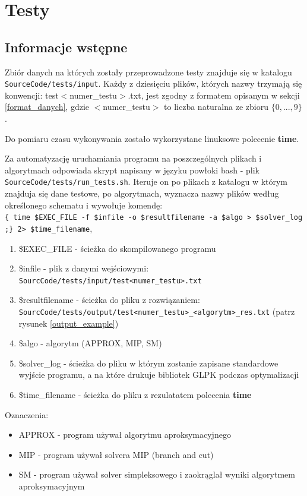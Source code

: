 \chapter{Testy}
\thispagestyle{chapterBeginStyle}
\section{Informacje wstępne}
Zbiór danych na których zostały przeprowadzone testy znajduje się w katalogu \verb|SourceCode/tests/input|. Każdy z dziesięciu plików, których nazwy trzymają się konwencji: test$<$numer\_testu$>$.txt, jest zgodny z formatem opisanym w sekcji \ref{format_danych}, gdzie $<$numer\_testu$>$ to liczba naturalna ze zbioru $\{0, ..., 9\}$.

Do pomiaru czasu wykonywania zostało wykorzystane linuksowe polecenie \textbf{time}.

Za automatyzację uruchamiania programu na poszczególnych plikach i algorytmach odpowiada skrypt napisany w języku powłoki bash - plik \verb|SourceCode/tests/run_tests.sh|. Iteruje on po plikach z katalogu w którym znajduja się dane testowe, po algorytmach, wyznacza nazwy plików według określonego schematu i wywołuje komendę: \\
\verb|{ time $EXEC_FILE -f $infile -o $resultfilename -a $algo > $solver_log ;} 2> $time_filename|, 

\begin{enumerate}
	\item \$EXEC\_FILE - ścieżka do skompilowanego programu
	\item \$infile - plik z danymi wejściowymi: \\
	\verb|SourcCode/tests/input/test<numer_testu>.txt|
	\item \$resultfilename - ścieżka do pliku z rozwiązaniem: \\ \verb|SourcCode/tests/output/test<numer_testu>_<algorytm>_res.txt| (patrz rysunek \ref{output_example})
	\item \$algo - algorytm (APPROX, MIP, SM)
	\item \$solver\_log - ścieżka do pliku w którym zostanie zapisane standardowe wyjście programu, a na które drukuje bibliotek GLPK podczas optymalizacji
	\item \$time\_filename - ścieżka do pliku z rezulatatem polecenia \textbf{time}
\end{enumerate}

Oznaczenia:
\begin{itemize}
	\item APPROX - program używał algorytmu aproksymacyjnego
	\item MIP - program używał solvera MIP (branch and cut)
	\item SM - program używał solver simpleksowego i zaokrąglał wyniki algorytmem aproksymacyjnym
\end{itemize}

